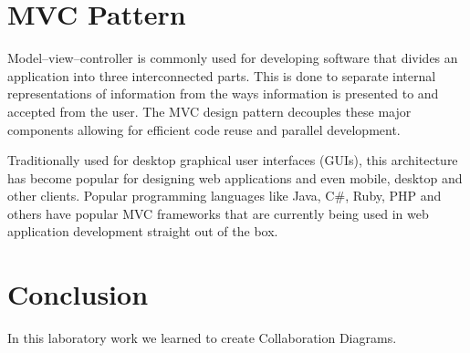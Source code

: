 \documentclass[12pt,a4paper,titlepage]{article}
\begin{document}
\section{MVC Pattern}
Model–view–controller is commonly used for developing software that divides an application into three interconnected parts. This is done to separate internal representations of information from the ways information is presented to and accepted from the user. The MVC design pattern decouples these major components allowing for efficient code reuse and parallel development.\par
Traditionally used for desktop graphical user interfaces (GUIs), this architecture has become popular for designing web applications and even mobile, desktop and other clients. Popular programming languages like Java, C\#, Ruby, PHP and others have popular MVC frameworks that are currently being used in web application development straight out of the box.\par
\section{Conclusion}
In this laboratory work we learned to create Collaboration Diagrams.

\clearpage
\cleardoublepage
\end{document}

